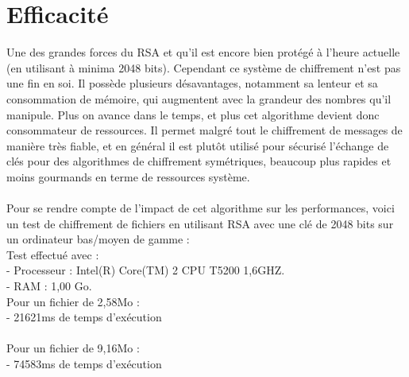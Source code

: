 	\section{Efficacité}
		Une des grandes forces du RSA et qu'il est encore bien protégé à l'heure actuelle (en utilisant à minima 2048 bits). Cependant ce système de chiffrement n'est pas une fin en soi. Il possède plusieurs désavantages, notamment sa lenteur et sa consommation de mémoire, qui augmentent avec la grandeur des nombres qu'il manipule. Plus on avance dans le temps, et plus cet algorithme devient donc consommateur de ressources. Il permet malgré tout le chiffrement de messages de manière très fiable, et en général il est plutôt utilisé pour sécurisé l'échange de clés pour des algorithmes de chiffrement symétriques, beaucoup plus rapides et moins gourmands en terme de ressources système.\\
		\\
		Pour se rendre compte de l'impact de cet algorithme sur les performances, voici un test de chiffrement de fichiers en utilisant RSA avec une clé de 2048 bits sur un ordinateur bas/moyen de gamme :\\
			Test effectué avec :\\
			- Processeur : Intel(R) Core(TM) 2 CPU T5200 1,6GHZ.\\
			- RAM : 1,00 Go.\\
			
			Pour un fichier de 2,58Mo :\\
				- 21621ms de temps d'exécution\\\\ 
			Pour un fichier de 9,16Mo :\\
				- 74583ms de temps d'exécution\\
